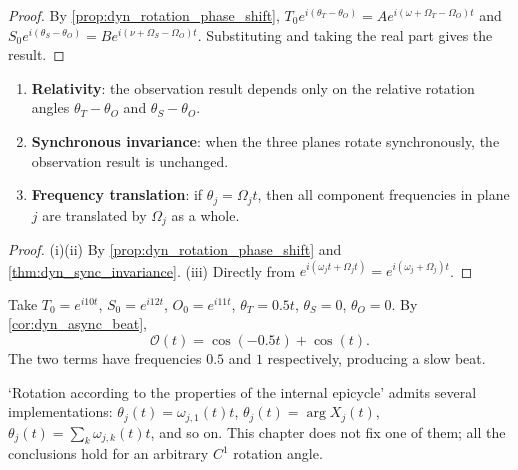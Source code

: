 \begin{proof}
By \cref{prop:dyn_rotation_phase_shift}, $T_0e^{i(\theta_T-\theta_O)}=A e^{i(\omega+\Omega_T-\Omega_O)t}$ and $S_0e^{i(\theta_S-\theta_O)}=B e^{i(\nu+\Omega_S-\Omega_O)t}$. Substituting and taking the real part gives the result.
\end{proof}

\begin{property}\label{prop:dyn_rotating_planes_properties}
\begin{enumerate}[label=(\roman*)]
    \item \textbf{Relativity}: the observation result depends only on the relative rotation angles $\theta_T-\theta_O$ and $\theta_S-\theta_O$.
    \item \textbf{Synchronous invariance}: when the three planes rotate synchronously, the observation result is unchanged.
    \item \textbf{Frequency translation}: if $\theta_j=\Omega_j t$, then all component frequencies in plane $j$ are translated by $\Omega_j$ as a whole.
\end{enumerate}
\end{property}

\begin{proof}
(i)(ii) By \cref{prop:dyn_rotation_phase_shift} and \cref{thm:dyn_sync_invariance}. (iii) Directly from $e^{i(\omega_j t+\Omega_j t)}=e^{i(\omega_j+\Omega_j)t}$.
\end{proof}

\begin{example}\label{ex:dyn_rotating_planes_example}
Take $T_0=e^{i10t}$, $S_0=e^{i12t}$, $O_0=e^{i11t}$, $\theta_T=0.5t$, $\theta_S=0$, $\theta_O=0$. By \cref{cor:dyn_async_beat},
\[
\mathcal O(t)=\cos(-0.5t)+\cos(t).
\]
The two terms have frequencies $0.5$ and $1$ respectively, producing a slow beat.
\end{example}

\begin{remark}\label{rem:dyn_rotation_angle_choice}
`Rotation according to the properties of the internal epicycle' admits several implementations: $\theta_j(t)=\omega_{j,1}(t)t$, $\theta_j(t)=\arg X_j(t)$, $\theta_j(t)=\sum_k\omega_{j,k}(t)t$, and so on. This chapter does not fix one of them; all the conclusions hold for an arbitrary $C^1$ rotation angle.
\end{remark}


